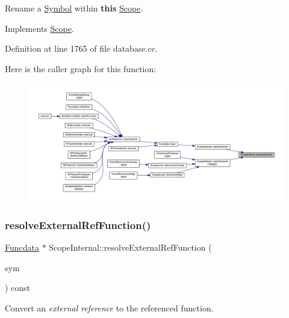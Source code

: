 Rename a \mbox{\hyperlink{class_symbol}{Symbol}} within {\bfseries{this}} \mbox{\hyperlink{class_scope}{Scope}}. 



Implements \mbox{\hyperlink{class_scope_ab576de2e768be9507ee03faa163c1ddf}{Scope}}.



Definition at line 1765 of file database.\+cc.

Here is the caller graph for this function\+:
\nopagebreak
\begin{figure}[H]
\begin{center}
\leavevmode
\includegraphics[width=350pt]{class_scope_internal_ada63ff8f4efed6fd4605441a0150ae6f_icgraph}
\end{center}
\end{figure}
\mbox{\label{class_scope_internal_acf54c42b2ce7edfa37f9bf1223bc2840}} 
\subsubsection{\texorpdfstring{resolveExternalRefFunction()}{resolveExternalRefFunction()}}
{\footnotesize\ttfamily \mbox{\hyperlink{class_funcdata}{Funcdata}} $\ast$ Scope\+Internal\+::resolve\+External\+Ref\+Function (\begin{DoxyParamCaption}\item[{\mbox{\hyperlink{class_extern_ref_symbol}{Extern\+Ref\+Symbol}} $\ast$}]{sym }\end{DoxyParamCaption}) const\hspace{0.3cm}{\ttfamily [virtual]}}



Convert an {\itshape external} {\itshape reference} to the referenced function. 


